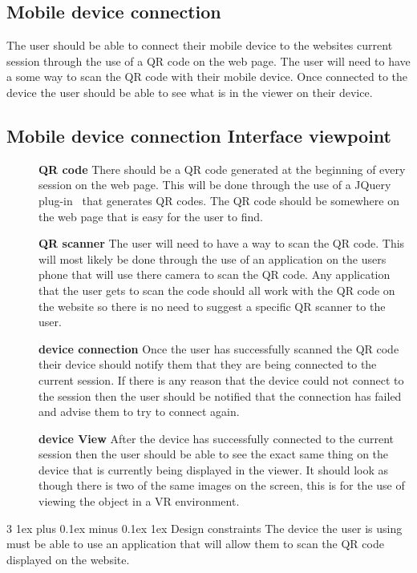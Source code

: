 \documentclass[letterpaper, 10pt, draftclsnofoot, compsoc, onecolumn]{IEEEtran}
\makeatletter
\def\subsubsection{\@startsection{subsubsection}%
                                 {3}%
                                 {\z@}%
                                 {1ex plus 0.1ex minus 0.1ex}%
                                 {1ex}%
                                 {\normalfont\normalsize}}%
\makeatother
\begin{document}
\subsection{Mobile device connection}
\label{mobileDevice}
	The user should be able to connect their mobile device to the websites current session through the use of a QR code on the web page. The user will need to have a some way to scan the QR code with their mobile device. Once connected to the device the user should be able to see what is in the viewer on their device.

\subsection{Mobile device connection Interface viewpoint}
\begin{description}
	\item[]\textbf{QR code} There should be a QR code generated at the beginning of every session on the web page. This will be done through the use of a JQuery plug-in~\cite{QR2016} that generates QR codes. The QR code should be somewhere on the web page that is easy for the user to find. 
	\item[]\textbf{QR scanner} The user will need to have a way to scan the QR code. This will most likely be done through the use of an application on the users phone that will use there camera to scan the QR code. Any application that the user gets to scan the code should all work with the QR code on the website so there is no need to suggest a specific QR scanner to the user. 
	\item[]\textbf{device connection} Once the user has successfully scanned the QR code their device should notify them that they are being connected to the current session. If there is any reason that the device could not connect to the session then the user should be notified that the connection has failed and advise them to try to connect again.
	\item[]\textbf{device View} After the device has successfully connected to the current session then the user should be able to see the exact same thing on the device that is currently being displayed in the viewer. It should look as though there is two of the same images on the screen, this is for the use of viewing the object in a VR environment.  
\end{description}

\subsubsection{Design constraints}
	The device the user is using must be able to use an application that will allow them to scan the QR code displayed on the website. 
\end{document}
